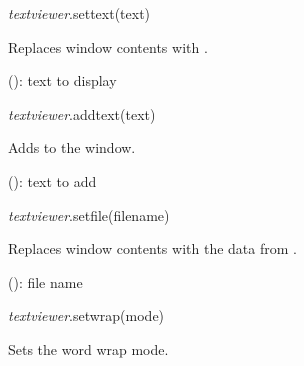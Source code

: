 \documentclass[a4paper,12pt,twoside,extrafontsizes]{memoir}
\begin{document}

\begin{luafuncprototype}
\emph{textviewer}.settext(text)
\end{luafuncprototype}

\begin{funcdescr}
	Replaces window contents with .
\end{funcdescr}

\begin{funcparams}
	 (): text to display
\end{funcparams}


\begin{luafuncprototype}
\emph{textviewer}.addtext(text)
\end{luafuncprototype}

\begin{funcdescr}
	Adds  to the window.
\end{funcdescr}

\begin{funcparams}
	 (): text to add
\end{funcparams}


\begin{luafuncprototype}
\emph{textviewer}.setfile(filename)
\end{luafuncprototype}

\begin{funcdescr}
	Replaces window contents with the data from .
\end{funcdescr}

\begin{funcparams}
	 (): file name
\end{funcparams}


\begin{luafuncprototype}
\emph{textviewer}.setwrap(mode)
\end{luafuncprototype}

\begin{funcdescr}
	Sets the word wrap mode.
\end{funcdescr}
\end{document}
